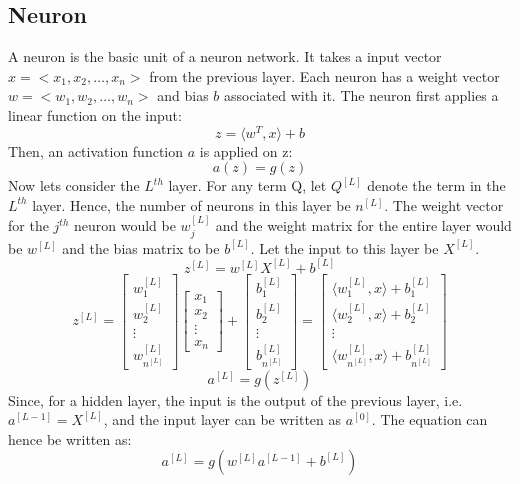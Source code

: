 \documentclass[12pt]{article}
\newcommand{\innerproduct}[2]{\langle#1, #2 \rangle}
\begin{document}
\subsection*{Neuron}
A neuron is the basic unit of a neuron network. It takes a input vector $x = <x_1,x_2,\dots,x_n>$ from the previous layer. Each neuron has a weight vector $w = <w_1,w_2,\dots,w_n>$ and bias $b$ associated with it. The neuron first applies a linear function on the input:
\begin{equation*}
    z = \innerproduct{w^T}{x} + b
\end{equation*}
Then, an activation function $a$ is applied on z:
\begin{equation}
    a(z) = g(z)
\end{equation}
\newpage
Now lets consider the $L^{th}$ layer. For any term Q, let $Q^{[L]}$ denote the term in the $L^{th}$ layer. Hence, the number of neurons in this layer be $n^{[L]}$. The weight vector for the $j^{th}$ neuron would be $w^{[L]}_j$ and the weight matrix for the entire layer would be $w^{[L]}$ and the bias matrix to be $b^{[L]}$. Let the input to this layer be $X^{[L]}$.
\begin{equation}
    z^{[L]} = w^{[L]}X^{[L]} + b^{[L]}
\end{equation}
\begin{equation}
    z^{[L]} = \begin{bmatrix} w^{[L]}_1 \\ w^{[L]}_2 \\ \vdots \\ w^{[L]}_{n^{[L]}} \end{bmatrix} \begin{bmatrix} x_1 \\ x_2 \\ \vdots \\ x_n \end{bmatrix} + \begin{bmatrix} b^{[L]}_1 \\ b^{[L]}_2 \\ \vdots \\ b^{[L]}_{n^{[L]}} \end{bmatrix} = \begin{bmatrix} \innerproduct{w^{[L]}_1}{x} + b^{[L]}_1 \\ \innerproduct{w^{[L]}_2}{x} + b^{[L]}_2 \\ \vdots \\ \innerproduct{w^{[L]}_{n^{[L]}}}{x} + b^{[L]}_{n^{[L]}} \end{bmatrix}
\end{equation}
\begin{equation}
    a^{[L]} = g(z^{[L]})
\end{equation}
Since, for a hidden layer, the input is the output of the previous layer, i.e. $a^{[L-1]}=X^{[L]}$, and the input layer can be written as $a^{[0]}$. The equation can hence be written as:
\begin{equation}
    a^{[L]} = g(w^{[L]}a^{[L-1]} + b^{[L]})
\end{equation}
\end{document}
